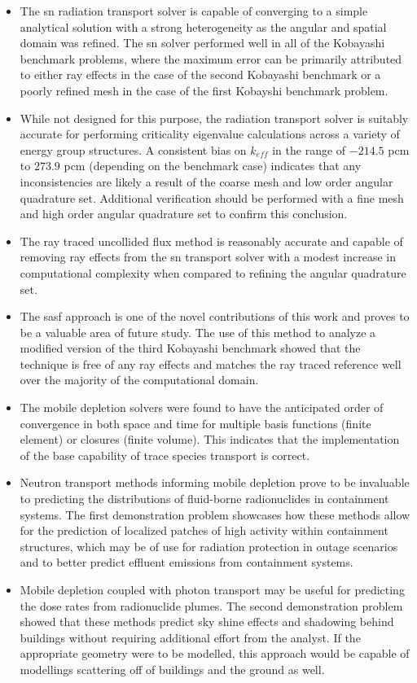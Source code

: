 \begin{itemize}
    \item The \acrshort{sn} radiation transport solver is capable of converging to a simple analytical solution with a strong heterogeneity as the angular and spatial domain was refined. The \acrshort{sn} solver performed well in all of the Kobayashi benchmark problems, where the maximum error can be primarily attributed to either ray effects in the case of the second Kobayashi benchmark or a poorly refined mesh in the case of the first Kobayshi benchmark problem. 
    \item While not designed for this purpose, the radiation transport solver is suitably accurate for performing criticality eigenvalue calculations across a variety of energy group structures. A consistent bias on $k_{eff}$ in the range of $-214.5$ pcm to $273.9$ pcm (depending on the benchmark case) indicates that any inconsistencies are likely a result of the coarse mesh and low order angular quadrature set. Additional verification should be performed with a fine mesh and high order angular quadrature set to confirm this conclusion.
    \item The ray traced uncollided flux method is reasonably accurate and capable of removing ray effects from the \acrshort{sn} transport solver with a modest increase in computational complexity when compared to refining the angular quadrature set. 
    \item The \acrshort{sasf} approach is one of the novel contributions of this work and proves to be a valuable area of future study. The use of this method to analyze a modified version of the third Kobayashi benchmark showed that the technique is free of any ray effects and matches the ray traced reference well over the majority of the computational domain. 
    \item The mobile depletion solvers were found to have the anticipated order of convergence in both space and time for multiple basis functions (finite element) or closures (finite volume). This indicates that the implementation of the base capability of trace species transport is correct.
    \item Neutron transport methods informing mobile depletion prove to be invaluable to predicting the distributions of fluid-borne radionuclides in containment systems. The first demonstration problem showcases how these methods allow for the prediction of localized patches of high activity within containment structures, which may be of use for radiation protection in outage scenarios and to better predict effluent emissions from containment systems.
    \item Mobile depletion coupled with photon transport may be useful for predicting the dose rates from radionuclide plumes. The second demonstration problem showed that these methods predict sky shine effects and shadowing behind buildings without requiring additional effort from the analyst. If the appropriate geometry were to be modelled, this approach would be capable of modellings scattering off of buildings and the ground as well.
\end{itemize}

